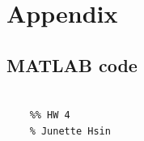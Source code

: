 \documentclass[conf]{new-aiaa}
\begin{document}
\section*{Appendix} 

\subsection*{MATLAB code} 

\begin{lstlisting}

    %% HW 4 
    % Junette Hsin 
    

    
	
\end{lstlisting}






% 
\end{document}
